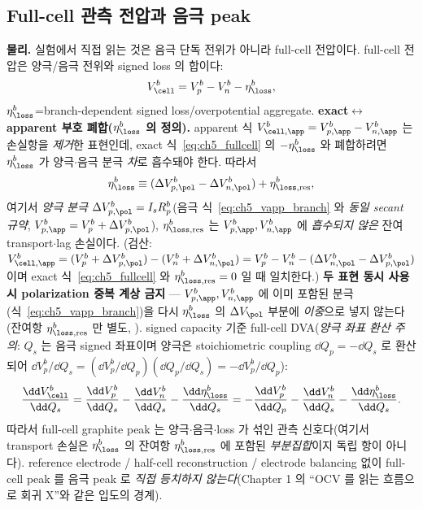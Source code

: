 \subsection{Full-cell 관측 전압과 음극 peak}\label{sec:ch5_fullcell}
\textbf{물리.} 실험에서 직접 읽는 것은 음극 단독 전위가 아니라 full-cell 전압이다. full-cell 전압은 양극/음극
전위와 signed loss 의 합이다:
\begin{equation}
V_\cell^b=V_p^b-V_n^b-\eta_\loss^b,
\label{eq:ch5_fullcell}
\end{equation}
$\eta_\loss^b$=branch-dependent signed loss/overpotential aggregate. \textbf{exact$\leftrightarrow$apparent 부호
폐합($\eta_\loss^b$ 의 정의).} apparent 식 $V_{\cell,\app}^b=V_{p,\app}^b-V_{n,\app}^b$ 는 손실항을 \emph{제거}한
표현인데, exact 식~\eqref{eq:ch5_fullcell} 의 $-\eta_\loss^b$ 와 폐합하려면 $\eta_\loss^b$ 가 양극$\cdot$음극
분극 \emph{차}로 흡수돼야 한다. 따라서
\begin{equation}
\eta_\loss^b\equiv(\Delta V_{p,\pol}^b-\Delta V_{n,\pol}^b)+\eta_{\loss,\mathrm{res}}^b,
\label{eq:ch5_etaloss_def}
\end{equation}
여기서 \emph{양극 분극} $\Delta V_{p,\pol}^b=I_s R_p^b$(음극 식~\eqref{eq:ch5_vapp_branch} 와 \emph{동일 secant
규약}, $V_{p,\app}^b=V_p^b+\Delta V_{p,\pol}^b$), $\eta_{\loss,\mathrm{res}}^b$ 는 $V_{p,\app}^b,V_{n,\app}^b$ 에
\emph{흡수되지 않은} 잔여 transport$\cdot$lag 손실이다. (검산: $V_{\cell,\app}^b=(V_p^b+\Delta V_{p,\pol}^b)
-(V_n^b+\Delta V_{n,\pol}^b)=V_p^b-V_n^b-(\Delta V_{n,\pol}^b-\Delta V_{p,\pol}^b)$ 이며 exact 식~\eqref{eq:ch5_fullcell}
와 $\eta_{\loss,\mathrm{res}}^b=0$ 일 때 일치한다.) \textbf{두 표현 동시 사용 시 polarization 중복 계상 금지} —
$V_{p,\app}^b,V_{n,\app}^b$ 에 이미 포함된 분극(식~\eqref{eq:ch5_vapp_branch})을 다시 $\eta_\loss^b$ 의 $\Delta V_\pol$
부분에 \emph{이중}으로 넣지 않는다(잔여항 $\eta_{\loss,\mathrm{res}}^b$ 만 별도, ). signed capacity 기준
full-cell DVA(\emph{양극 좌표 환산 주의}: $Q_s$ 는 음극 signed 좌표이며 양극은 stoichiometric coupling $\dd Q_p=
-\dd Q_s$ 로 환산되어 $\dd V_p^b/\dd Q_s=(\dd V_p^b/\dd Q_p)(\dd Q_p/\dd Q_s)=-\dd V_p^b/\dd Q_p$):
\begin{equation}
\frac{\dd V_\cell^b}{\dd Q_s}=\frac{\dd V_p^b}{\dd Q_s}-\frac{\dd V_n^b}{\dd Q_s}-\frac{\dd\eta_\loss^b}{\dd Q_s}
=-\frac{\dd V_p^b}{\dd Q_p}-\frac{\dd V_n^b}{\dd Q_s}-\frac{\dd\eta_\loss^b}{\dd Q_s}.
\label{eq:ch5_fullcell_dva}
\end{equation}
따라서 full-cell graphite peak 는 양극$\cdot$음극$\cdot$loss 가 섞인 관측 신호다(여기서 transport 손실은
$\eta_\loss^b$ 의 잔여항 $\eta_{\loss,\mathrm{res}}^b$ 에 포함된 \emph{부분집합}이지 독립 항이 아니다). reference
electrode / half-cell reconstruction / electrode balancing 없이 full-cell peak 를 음극 peak 로 \emph{직접
등치하지 않는다}(Chapter 1 의 ``OCV 를 읽는 흐름으로 회귀 X''와 같은 입도의 경계).


